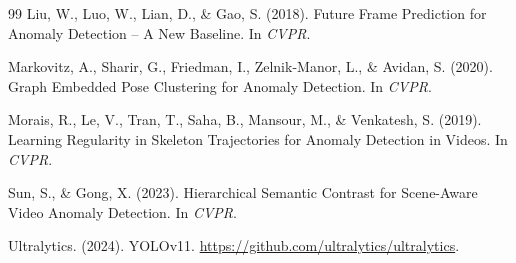 \documentclass{article}
\begin{document}
\begin{thebibliography}{99}
Liu, W., Luo, W., Lian, D., \& Gao, S. (2018).
\newblock Future Frame Prediction for Anomaly Detection -- A New Baseline.
In {\em CVPR}.

Markovitz, A., Sharir, G., Friedman, I., Zelnik-Manor, L., \& Avidan, S. (2020).
\newblock Graph Embedded Pose Clustering for Anomaly Detection.
In {\em CVPR}.

Morais, R., Le, V., Tran, T., Saha, B., Mansour, M., \& Venkatesh, S. (2019).
\newblock Learning Regularity in Skeleton Trajectories for Anomaly Detection in Videos.
In {\em CVPR}.

Sun, S., \& Gong, X. (2023).
\newblock Hierarchical Semantic Contrast for Scene-Aware Video Anomaly Detection.
In {\em CVPR}.

Ultralytics. (2024).
\newblock YOLOv11.
\newblock \url{https://github.com/ultralytics/ultralytics}.

\end{thebibliography}
\end{document}
